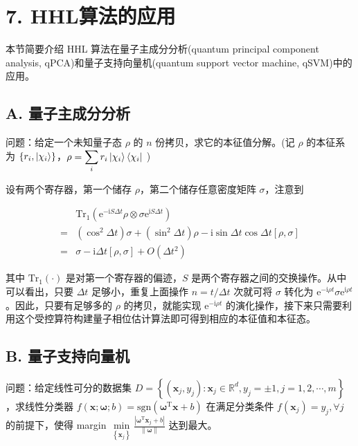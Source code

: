 \documentclass[aps,prl,twocolumn,groupedaddress]{revtex4-2}
\begin{document}
\section{7. HHL算法的应用}

本节简要介绍 HHL 算法在量子主成分分析(quantum principal component analysis, qPCA)和量子支持向量机(quantum support vector machine, qSVM)中的应用。

\subsection{A. 量子主成分分析}

问题：给定一个未知量子态 $\rho$ 的 $n$ 份拷贝，求它的本征值分解。(记 $\rho$ 的本征系为 $\left\{r_i,\ket{\chi_i} \right\}$，$\displaystyle{\rho=\sum_{i} r_i\ket{\chi_i}\bra{\chi_i} }$ )

设有两个寄存器，第一个储存 $\rho$，第二个储存任意密度矩阵 $\sigma$，注意到

$$
\begin{aligned}
&\mathrm{Tr}_1\left(\mathrm{e}^{-\mathrm{i}S\Delta t}\rho\otimes \sigma \mathrm{e}^{\mathrm{i}S\Delta t}\right) \\
=&\left(\cos^2\Delta t \right)\sigma + \left(\sin^2\Delta t \right)\rho - \mathrm{i}\sin\Delta t\cos\Delta t[\rho,\sigma] \\
=&\sigma-\mathrm{i}\Delta t[\rho,\sigma] + O\left(\Delta t^2 \right)
\end{aligned}
$$

其中 $\mathrm{Tr}_1(\cdot)$ 是对第一个寄存器的偏迹，$S$ 是两个寄存器之间的交换操作。从中可以看出，只要 $\Delta t$ 足够小，重复上面操作 $n=t/\Delta t$ 次就可将 $\sigma$ 转化为 $\mathrm{e}^{-\mathrm{i}\rho t}\sigma\mathrm{e}^{\mathrm{i}\rho t}$。因此，只要有足够多的 $\rho$ 的拷贝，就能实现 $\mathrm{e}^{-\mathrm{i}\rho t}$ 的演化操作，接下来只需要利用这个受控算符构建量子相位估计算法即可得到相应的本征值和本征态。

\subsection{B. 量子支持向量机}

问题：给定线性可分的数据集 $D=\left\{(\pmb{x}_j,y_j):\pmb{x}_j\in\mathbb{R}^d,y_j=\pm 1,j=1,2,\cdots,m \right\}$，求线性分类器 $f(\pmb{x};\pmb{\omega};b)=\mathrm{sgn}\left(\pmb{\omega}^{\mathrm{T}}\pmb{x}+b \right)$ 在满足分类条件 $f(\pmb{x}_j)=y_j,\forall j$ 的前提下，使得 margin $\min\limits_{\left\{\pmb{x}_j \right\}}\frac{\left|\pmb{\omega}^{\mathrm{T}}\pmb{x}_j + b \right| }{\|\pmb{\omega} \| } $ 达到最大。
\end{document}
